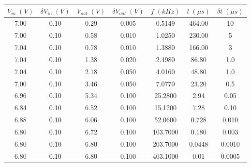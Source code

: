 \begin{tabular}{cc|cc|ccc}
\toprule
$V_{in} \; (V)$ & $\delta V_{in} \; (V)$ & $V_{out} \; (V)$ & $\delta V_{out} \; (V)$ & $f \; (kHz)$ & $t \; (\mu s)$ & $\delta t \; (\mu s)$ \\
\midrule
           7.00 &                    0.10 &            0.29 &                   0.005 &       0.5149 &       464.00 &               10 \\
           7.00 &                    0.10 &            0.58 &                   0.010 &       1.0250 &       230.00 &                5 \\
           7.04 &                    0.10 &            0.78 &                   0.010 &       1.3880 &       166.00 &                3 \\
           7.04 &                    0.10 &            1.38 &                   0.020 &       2.4980 &        86.80 &                1.0 \\
           7.04 &                    0.10 &            2.18 &                   0.050 &       4.0160 &        48.80 &                1.0 \\
           7.00 &                    0.10 &            3.46 &                   0.050 &       7.0770 &        23.20 &                0.5 \\
           6.96 &                    0.10 &            5.34 &                   0.100 &      25.2800 &         2.94 &                0.05 \\
           6.84 &                    0.10 &            6.52 &                   0.100 &      15.1200 &         7.28 &                0.10 \\
           6.88 &                    0.10 &            6.06 &                   0.100 &      52.0600 &         0.728 &                0.010 \\
           6.80 &                    0.10 &            6.72 &                   0.100 &     103.7000 &         0.180 &                0.003 \\
           6.80 &                    0.10 &            6.80 &                   0.100 &     203.7000 &         0.0448 &                0.0010 \\
           6.80 &                    0.10 &            6.80 &                   0.100 &     403.1000 &         0.01 &                0.0005 \\
\bottomrule
\end{tabular}
